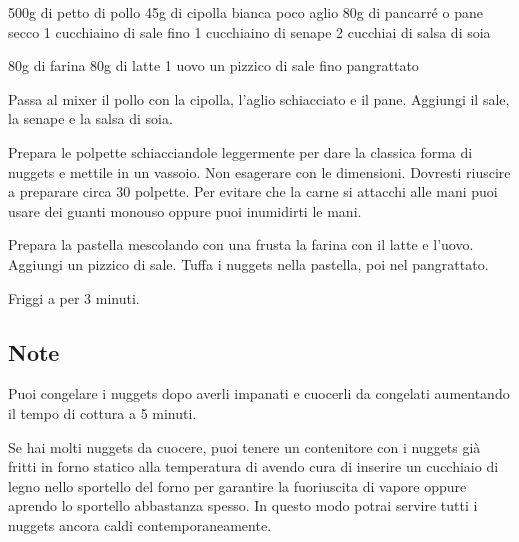 \begin{ingreds}
	500g di petto di pollo
	45g di cipolla bianca
	poco aglio
	80g di pancarré o pane secco
	1 cucchiaino di sale fino
	1 cucchiaino di senape
	2 cucchiai di salsa di soia

\columnbreak
{}
	80g di farina
	80g di latte
	1 uovo
	un pizzico di sale fino
	pangrattato
\end{ingreds}

\begin{method}
Passa al mixer il pollo con la cipolla, l'aglio schiacciato e il pane. Aggiungi il sale, la senape e la salsa di soia.

Prepara le polpette schiacciandole leggermente per dare la classica forma di nuggets e mettile in un vassoio. Non esagerare con le dimensioni. Dovresti riuscire a preparare circa 30 polpette. Per evitare che la carne si attacchi alle mani puoi usare dei guanti monouso oppure puoi inumidirti le mani.

Prepara la pastella mescolando con una frusta la farina con il latte e l'uovo. Aggiungi un pizzico di sale. Tuffa i nuggets nella pastella, poi nel pangrattato.

Friggi a  per 3 minuti.

\end {method}

\subsection*{Note}
		Puoi congelare i nuggets dopo averli impanati e cuocerli da congelati aumentando il tempo di cottura a 5 minuti.

		Se hai molti nuggets da cuocere, puoi tenere un contenitore con i nuggets già fritti in forno statico alla temperatura di  avendo cura di inserire un cucchiaio di legno nello sportello del forno per garantire la fuoriuscita di vapore oppure aprendo lo sportello abbastanza spesso. In questo modo potrai servire tutti i nuggets ancora caldi contemporaneamente.


